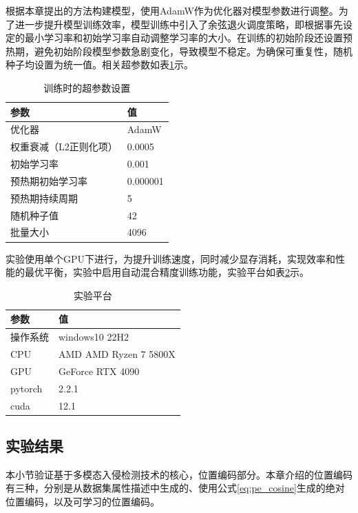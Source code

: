 根据本章提出的方法构建模型，使用AdamW作为优化器对模型参数进行调整。为了进一步提升模型训练效率，模型训练中引入了余弦退火调度策略，即根据事先设定的最小学习率和初始学习率自动调整学习率的大小。在训练的初始阶段还设置预热期，避免初始阶段模型参数急剧变化，导致模型不稳定。为确保可重复性，随机种子均设置为统一值。相关超参数如表\ref{tab:train_hyperargs}示。

\begin{table}[htb]
  \centering
  \caption{训练时的超参数设置}
    \begin{tabular}{ll}
    \toprule
\textbf{参数} & \textbf{值} \\
    \midrule
    优化器 & AdamW \\
    权重衰减（L2正则化项） & 0.0005 \\
    初始学习率 & 0.001 \\
    预热期初始学习率 & 0.000001 \\
    预热期持续周期 & 5  \\
    随机种子值 & 42 \\
    批量大小 & 4096 \\
    \bottomrule
    \end{tabular}
  \label{tab:train_hyperargs}
\end{table}

实验使用单个GPU下进行，为提升训练速度，同时减少显存消耗，实现效率和性能的最优平衡，实验中启用自动混合精度训练功能，实验平台如表\ref{tab:train_platform}示。

\begin{table}[htb]
  \centering
  \caption{实验平台}
    \begin{tabular}{ll}
    \toprule
\textbf{参数} & \textbf{值} \\
    \midrule
    操作系统 & windows10 22H2\\
    CPU & AMD AMD Ryzen 7 5800X \\
    GPU & GeForce RTX 4090 \\
    pytorch & 2.2.1 \\
    cuda & 12.1 \\
    \bottomrule
    \end{tabular}
  \label{tab:train_platform}
\end{table}

\subsection{实验结果}
本小节验证基于多模态入侵检测技术的核心，位置编码部分。本章介绍的位置编码有三种，分别是从数据集属性描述中生成的、使用公式\ref{eq:pe_cosine}生成的绝对位置编码，以及可学习的位置编码。

